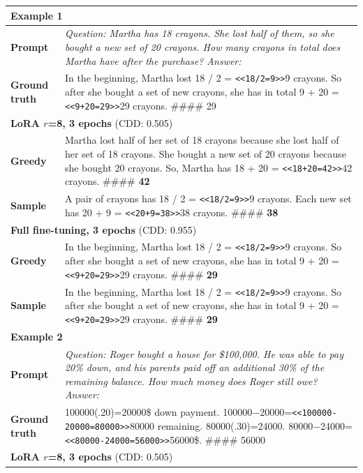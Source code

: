 \documentclass[11pt]{article}
\begin{document}
\begin{table}[t]
\centering
\small
\begin{tabular}{p{1.8cm}p{13.5cm}}
\toprule
\multicolumn{2}{l}{\textbf{Example 1}} \\
\midrule
\textbf{Prompt} & \textit{Question: Martha has 18 crayons. She lost half of them, so she bought a new set of 20 crayons. How many crayons in total does Martha have after the purchase? Answer:} \\
\textbf{Ground truth} & In the beginning, Martha lost 18 / 2 = \texttt{<<18/2=9>>}9 crayons. So after she bought a set of new crayons, she has in total 9 + 20 = \texttt{<<9+20=29>>}29 crayons. \#\#\#\# 29 \\
\midrule
\multicolumn{2}{l}{\textbf{LoRA $r$=8, 3 epochs} (CDD: 0.505)} \\
\textbf{Greedy} & Martha lost half of her set of 18 crayons because she lost half of her set of 18 crayons. She bought a new set of 20 crayons because she bought 20 crayons. So, Martha has 18 + 20 = \texttt{<<18+20=42>>}42 crayons. \#\#\#\# \textbf{42} \\
\textbf{Sample} & A pair of crayons has 18 / 2 = \texttt{<<18/2=9>>}9 crayons. Each new set has 20 + 9 = \texttt{<<20+9=38>>}38 crayons. \#\#\#\# \textbf{38} \\
\midrule
\multicolumn{2}{l}{\textbf{Full fine-tuning, 3 epochs} (CDD: 0.955)} \\
\textbf{Greedy} & In the beginning, Martha lost 18 / 2 = \texttt{<<18/2=9>>}9 crayons. So after she bought a set of new crayons, she has in total 9 + 20 = \texttt{<<9+20=29>>}29 crayons. \#\#\#\# \textbf{29} \\
\textbf{Sample} & In the beginning, Martha lost 18 / 2 = \texttt{<<18/2=9>>}9 crayons. So after she bought a set of new crayons, she has in total 9 + 20 = \texttt{<<9+20=29>>}29 crayons. \#\#\#\# \textbf{29} \\
\midrule
\midrule
\multicolumn{2}{l}{\textbf{Example 2}} \\
\midrule
\textbf{Prompt} & \textit{Question: Roger bought a house for \$100,000. He was able to pay 20\% down, and his parents paid off an additional 30\% of the remaining balance. How much money does Roger still owe? Answer:} \\
\textbf{Ground truth} & 100000(.20)=20000\$ down payment. 100000$-$20000=\texttt{<<100000-20000=80000>>}80000 remaining. 80000(.30)=24000. 80000$-$24000=\texttt{<<80000-24000=56000>>}56000\$. \#\#\#\# 56000 \\
\midrule
\multicolumn{2}{l}{\textbf{LoRA $r$=8, 3 epochs} (CDD: 0.505)} \\

\end{tabular}
\end{table}
\end{document}
